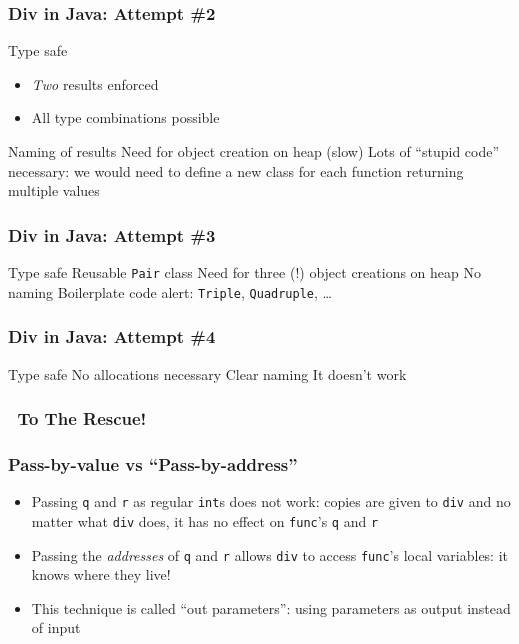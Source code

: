 \begin{frame}
  \frametitle{Div in Java: Attempt \#2}
  \begin{procontralist}
     Type safe
             \begin{itemize}
               \item \emph{Two} results enforced
               \item All type combinations possible
             \end{itemize}
     Naming of results
     Need for object creation on heap (slow)
     Lots of ``stupid code'' necessary: we would need to define a new class for each function returning multiple values
  \end{procontralist}
\end{frame}

\begin{frame}
  \frametitle{Div in Java: Attempt \#3}
  \begin{procontralist}
     Type safe
     Reusable {\tt Pair} class
     Need for three (!) object creations on heap
     No naming
     Boilerplate code alert: {\tt Triple}, {\tt Quadruple}, \dots
  \end{procontralist}
\end{frame}

\begin{frame}
  \frametitle{Div in Java: Attempt \#4}
  \begin{procontralist}
     Type safe
     No allocations necessary
     Clear naming
     It doesn't work \frownie
  \end{procontralist}
\end{frame}

\begin{frame}
  \frametitle{\cpp\ To The Rescue!}
\end{frame}

\begin{frame}
  \frametitle{Pass-by-value vs ``Pass-by-address''}
  \begin{itemize}
    \item Passing {\tt q} and {\tt r} as regular {\tt int}s does not work:
          copies are given to {\tt div} and no matter what {\tt div} does,
          it has no effect on {\tt func}'s {\tt q} and {\tt r}
    \item Passing the \emph{addresses} of {\tt q} and {\tt r}
          allows {\tt div} to access {\tt func}'s local variables:
          it knows where they live!
    \item This technique is called ``out parameters'': using parameters as output instead of input
  \end{itemize}
\end{frame}

